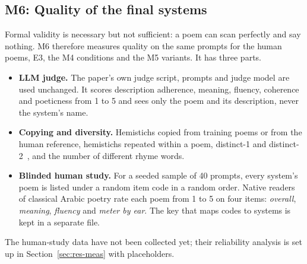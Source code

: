 \subsection{M6: Quality of the final systems}
\label{sec:m6}
Formal validity is necessary but not sufficient: a poem can scan perfectly and say nothing. M6 therefore measures
quality on the same prompts for the human poems, E3, the M4 conditions and the M5 variants. It has three parts.
\begin{itemize}
\item \textbf{LLM judge.} The paper's own judge script, prompts and judge model are used unchanged. It scores
description adherence, meaning, fluency, coherence and poeticness from 1 to 5 and sees only the poem and its
description, never the system's name.
\item \textbf{Copying and diversity.} Hemistichs copied from training poems or from the human reference, hemistichs
repeated within a poem, distinct-1 and distinct-2~\cite{chen2024diversity}, and the number of different rhyme words.
\item \textbf{Blinded human study.} For a seeded sample of 40 prompts, every system's poem is listed under a random item
code in a random order. Native readers of classical Arabic poetry rate each poem from 1 to 5 on four items:
\emph{overall}, \emph{meaning}, \emph{fluency} and \emph{meter by ear}. The key that maps codes to systems is kept in a
separate file.
\end{itemize}
The human-study data have not been collected yet; their reliability analysis is set up in Section~\ref{sec:res-meas}
with placeholders.
